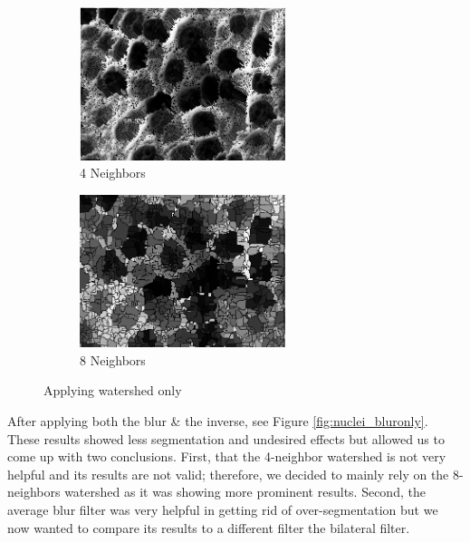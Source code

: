 \documentclass{article}
\begin{document}
\begin{figure}[H]
\centering
\begin{subfigure}{6cm}
  \centering
  \includegraphics[width=6cm]{experiments/nuclei/4_nucleiseg.png}
  \caption{4 Neighbors}
\end{subfigure}    
\begin{subfigure}{6cm}
  \centering
  \includegraphics[width=6cm]{experiments/nuclei/8_nucleiseg.png}
  \caption{8 Neighbors}
\end{subfigure}
\caption{Applying watershed only}
\label{fig:nuclei_main}
\end{figure}
\begin{flushleft}
After applying both the blur \& the inverse, see Figure \ref{fig:nuclei_bluronly}. These results showed less segmentation and undesired effects but allowed us to come up with two conclusions. First, that the 4-neighbor watershed is not very helpful and its results are not valid; therefore, we decided to mainly rely on the 8-neighbors watershed as it was showing more prominent results. Second, the average blur filter was very helpful in getting rid of over-segmentation but we now wanted to compare its results to a different filter the bilateral filter.
\end{flushleft}
\end{document}
